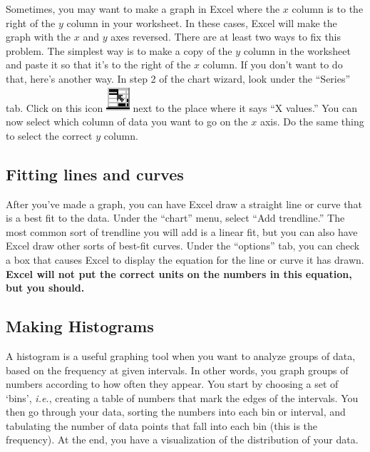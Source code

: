 Sometimes, you may want to make a graph in Excel where the $x$ column
is to the right of the $y$ column in your worksheet.  In these cases,
Excel will make the graph with the $x$ and $y$ axes reversed.  There
are at least two ways to fix this problem.  The simplest way is to make
a copy of the $y$ column in the worksheet and paste it so that it's
to the right of the $x$ column.  If you don't want to do that, here's
another way.  In step 2 of the chart wizard, look under the ``Series''
tab.  Click on this icon \includegraphics{excelicon.eps} next to the
place where it says ``X values.''  You can now select which column of data you
want to go on the $x$ axis. Do the same thing to select the correct
$y$ column.

\subsection{Fitting lines and curves}

After you've made a graph, you can have Excel draw a straight line or
curve that is a best fit to the data.  Under the ``chart'' menu,
select ``Add trendline.''  The most common sort of trendline you
will add is a linear fit, but you can also have Excel draw other
sorts of best-fit
curves.  Under the ``options'' tab, you can check a box that causes
Excel to display the equation for the line or curve it has drawn.
{\bf Excel will not put the correct units on the numbers in this equation,
but you should.}

\subsection{Making Histograms}

A histogram is a useful graphing tool when you want to analyze groups of data, based on the frequency at given intervals. 
In other words, you graph groups of numbers according to how often they appear.
You start by choosing a set of `bins', {\it i.e.}, creating a table of numbers that mark the edges of the intervals.
You then go through your data, sorting the numbers into each bin or interval, and tabulating the number of data points that fall into each bin (this is the 
frequency).
At the end, you have a visualization of the distribution of your data.   

